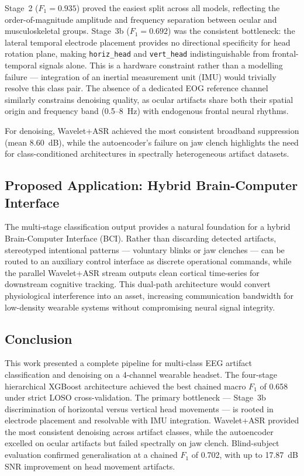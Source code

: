 \documentclass[11pt,a4paper]{article}
\begin{document}
Stage~2 ($F_1 = 0.935$) proved the easiest split across all models, reflecting the order-of-magnitude amplitude and frequency separation between ocular and musculoskeletal groups. Stage~3b ($F_1 = 0.692$) was the consistent bottleneck: the lateral temporal electrode placement provides no directional specificity for head rotation plane, making \texttt{horiz\_head} and \texttt{vert\_head} indistinguishable from frontal-temporal signals alone. This is a hardware constraint rather than a modelling failure — integration of an inertial measurement unit (IMU) would trivially resolve this class pair. The absence of a dedicated EOG reference channel similarly constrains denoising quality, as ocular artifacts share both their spatial origin and frequency band (0.5--8~Hz) with endogenous frontal neural rhythms.

For denoising, Wavelet+ASR achieved the most consistent broadband suppression (mean 8.60~dB), while the autoencoder's failure on jaw clench highlights the need for class-conditioned architectures in spectrally heterogeneous artifact datasets.

\subsection{Proposed Application: Hybrid Brain-Computer Interface}
The multi-stage classification output provides a natural foundation for a hybrid Brain-Computer Interface (BCI). Rather than discarding detected artifacts, stereotyped intentional patterns — voluntary blinks or jaw clenches — can be routed to an auxiliary control interface as discrete operational commands, while the parallel Wavelet+ASR stream outputs clean cortical time-series for downstream cognitive tracking. This dual-path architecture would convert physiological interference into an asset, increasing communication bandwidth for low-density wearable systems without compromising neural signal integrity.

\subsection{Conclusion}
This work presented a complete pipeline for multi-class EEG artifact classification and denoising on a 4-channel wearable headset. The four-stage hierarchical XGBoost architecture achieved the best chained macro $F_1$ of 0.658 under strict LOSO cross-validation. The primary bottleneck — Stage~3b discrimination of horizontal versus vertical head movements — is rooted in electrode placement and resolvable with IMU integration. Wavelet+ASR provided the most consistent denoising across artifact classes, while the autoencoder excelled on ocular artifacts but failed spectrally on jaw clench. Blind-subject evaluation confirmed generalisation at a chained $F_1$ of 0.702, with up to 17.87~dB SNR improvement on head movement artifacts.
\end{document}
